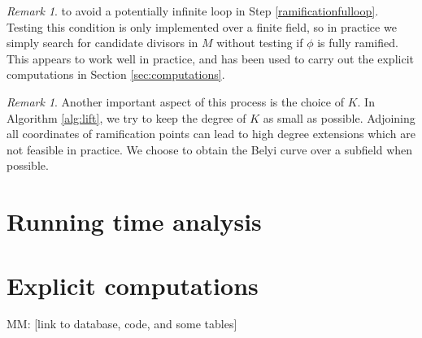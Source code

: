 \documentclass{dcthesis}
\newcommand{\mm}[1]{{\color{blue} \sf MM: [#1]}}
\numberwithin{equation}{section}
\theoremstyle{definition}
\theoremstyle{remark}
\newtheorem{remark}[equation]{Remark}
\begin{document}
{{\begin{remark}
      to avoid a potentially infinite loop in
      Step \ref{ramificationfulloop}.
      Testing this condition is only implemented over
      a finite field,
      so in practice we simply search for candidate divisors
      in $M$ without testing if $\phi$ is fully ramified.
      This appears to work well in practice,
      and has been used to carry out the explicit computations
      in Section \ref{sec:computations}.
    \end{remark}
    \begin{remark}
      \label{rmk:basefield}
      Another important aspect of this process is the choice of $K$.
      In Algorithm \ref{alg:lift},
      we try to keep the degree of $K$ as small as possible.
      Adjoining all coordinates of ramification points
      can lead to high degree extensions
      which are not feasible in practice.
      We choose to obtain the Belyi curve
      over a subfield when possible.
    \end{remark}
  }
  \section{Running time analysis}{\label{sec:runtime}
  }
  \section{Explicit computations}{\label{sec:computations}
    \mm{link to database, code, and some tables}
  }
} 
\end{document}
